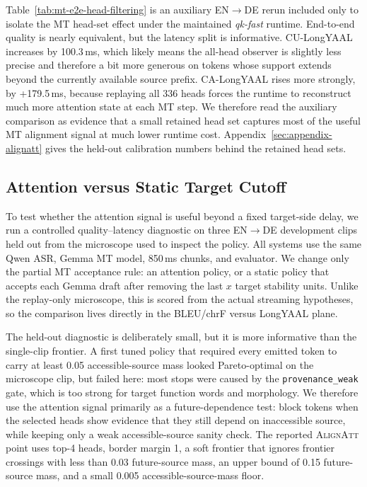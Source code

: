 \documentclass[11pt]{article}
\begin{document}
Table~\ref{tab:mt-e2e-head-filtering} is an auxiliary EN$\to$DE rerun included
only to isolate the MT head-set effect under the maintained \emph{qk-fast}
runtime. End-to-end quality is nearly equivalent, but the latency split is
informative. CU-LongYAAL increases by 100.3\,ms, which likely means the all-head
observer is slightly less precise and therefore a bit more generous on tokens
whose support extends beyond the currently available source prefix. CA-LongYAAL
rises more strongly, by +179.5\,ms, because replaying all 336 heads forces the
runtime to reconstruct much more attention state at each MT step. We therefore
read the auxiliary comparison as evidence that a small retained head set
captures most of the useful MT alignment signal at much lower runtime cost.
Appendix~\ref{sec:appendix-alignatt} gives the held-out calibration numbers
behind the retained head sets.



\subsection{Attention versus Static Target Cutoff}
\label{sec:cutoff-microscope}

To test whether the attention signal is useful beyond a fixed target-side
delay, we run a controlled quality--latency diagnostic on three EN$\to$DE
development clips held out from the microscope used to inspect the policy. All
systems use the same Qwen ASR, Gemma MT model, 850\,ms chunks, and evaluator.
We change only the partial MT acceptance rule: an attention policy, or a static
policy that accepts each Gemma draft after removing the last $x$ target
stability units. Unlike the replay-only microscope, this is scored from the
actual streaming hypotheses, so the comparison lives directly in the BLEU/chrF
versus LongYAAL plane.



The held-out diagnostic is deliberately small, but it is more informative than
the single-clip frontier. A first tuned policy that required every emitted token
to carry at least 0.05 accessible-source mass looked Pareto-optimal on the
microscope clip, but failed here: most stops were caused by the
\texttt{provenance\_weak} gate, which is too strong for target function words
and morphology. We therefore use the attention signal primarily as a
future-dependence test: block tokens when the selected heads show evidence that
they still depend on inaccessible source, while keeping only a weak
accessible-source sanity check. The reported \textsc{AlignAtt} point uses top-4
heads, border margin 1, a soft frontier that ignores frontier crossings with
less than 0.03 future-source mass, an upper bound of 0.15 future-source mass,
and a small 0.005 accessible-source-mass floor.
\end{document}
